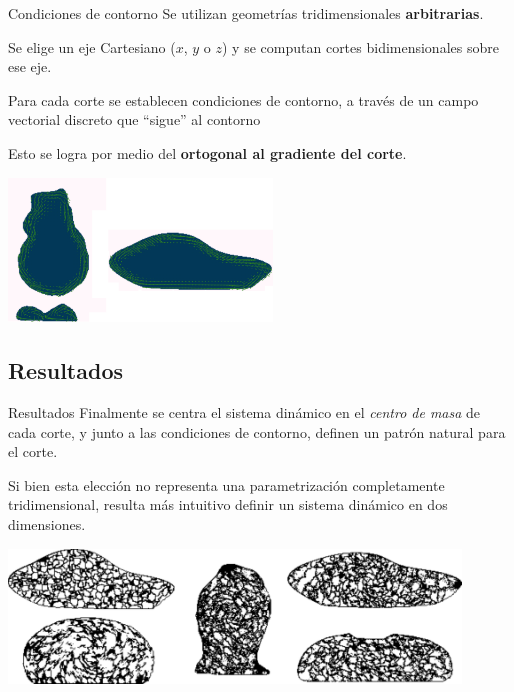 \documentclass[spanish]{beamer}
\begin{document}
\begin{frame}{Condiciones de contorno}
Se utilizan geometrías tridimensionales \textbf{arbitrarias}.

Se elige un eje Cartesiano ($x$, $y$ o $z$) y se computan cortes bidimensionales sobre ese eje.

Para cada corte se establecen condiciones de contorno, a través de un campo vectorial discreto que ``sigue'' al contorno

Esto se logra por medio del \textbf{ortogonal al gradiente del corte}.

  \centerline{\includegraphics[width=7cm]{../figures/Fig4}}
\end{frame}

\subsection{Resultados}

\begin{frame}{Resultados}
Finalmente se centra el sistema dinámico en el {\em centro de masa} de cada corte, y junto a las condiciones de contorno, definen un patrón natural para el corte.

Si bien esta elección no representa una parametrización completamente tridimensional, resulta más intuitivo definir un sistema dinámico en dos dimensiones.

\includegraphics[width=12cm]{../figures/Fig5}
\end{frame}
\end{document}
